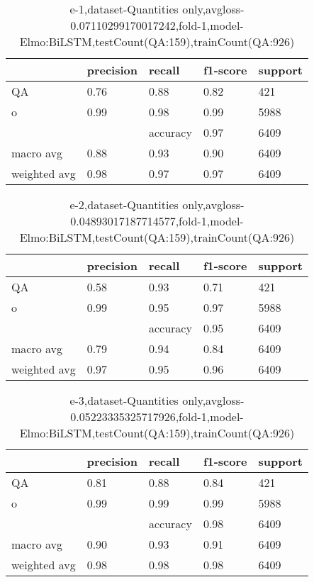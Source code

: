 \begin{table}[!ht] 
\centering
\caption{e-1,dataset-Quantities only,avgloss-0.07110299170017242,fold-1,model-Elmo:BiLSTM,testCount(QA:159),trainCount(QA:926)}\label{e-1data-quantS.tsv}
\begin{tabularx}{300pt}{|X|X|X|X|X|}
\hline
&precision&recall&f1-score&support\\
\hline
QA&0.76&0.88&0.82&421\\
\hline
o&0.99&0.98&0.99&5988\\
\hline
&&accuracy&0.97&6409\\
\hline
macro avg&0.88&0.93&0.90&6409\\
\hline
weighted avg&0.98&0.97&0.97&6409\\
\hline
\end{tabularx}
\end{table}
\begin{table}[!ht] 
\centering
\caption{e-2,dataset-Quantities only,avgloss-0.04893017187714577,fold-1,model-Elmo:BiLSTM,testCount(QA:159),trainCount(QA:926)}\label{e-2data-quantS.tsv}
\begin{tabularx}{300pt}{|X|X|X|X|X|}
\hline
&precision&recall&f1-score&support\\
\hline
QA&0.58&0.93&0.71&421\\
\hline
o&0.99&0.95&0.97&5988\\
\hline
&&accuracy&0.95&6409\\
\hline
macro avg&0.79&0.94&0.84&6409\\
\hline
weighted avg&0.97&0.95&0.96&6409\\
\hline
\end{tabularx}
\end{table}
\begin{table}[!ht] 
\centering
\caption{e-3,dataset-Quantities only,avgloss-0.05223335325717926,fold-1,model-Elmo:BiLSTM,testCount(QA:159),trainCount(QA:926)}\label{e-3data-quantS.tsv}
\begin{tabularx}{300pt}{|X|X|X|X|X|}
\hline
&precision&recall&f1-score&support\\
\hline
QA&0.81&0.88&0.84&421\\
\hline
o&0.99&0.99&0.99&5988\\
\hline
&&accuracy&0.98&6409\\
\hline
macro avg&0.90&0.93&0.91&6409\\
\hline
weighted avg&0.98&0.98&0.98&6409\\
\hline
\end{tabularx}
\end{table}
